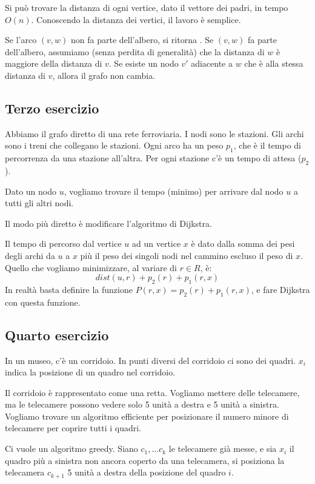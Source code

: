 Si pu\`o trovare la distanza di ogni vertice, dato il vettore dei padri, in tempo $O(n)$. Conoscendo la distanza dei vertici, il lavoro \`e semplice.

Se l'arco $(v,w)$ non fa parte dell'albero, si ritorna . Se $(v,w)$ fa parte dell'albero, assumiamo (senza perdita di generalit\`a) che la distanza di $w$ \`e maggiore della distanza di $v$. Se esiste un nodo $v'$ adiacente a $w$ che \`e alla stessa distanza di $v$, allora il grafo non cambia.

\clearpage

\subsection{Terzo esercizio}

Abbiamo il grafo diretto di una rete ferroviaria. I nodi sono le stazioni. Gli archi sono i treni che collegano le stazioni. Ogni arco ha un peso $p_1$, che \`e il tempo di percorrenza da una stazione all'altra. Per ogni stazione c'\`e un tempo di attesa ($p_2$).

Dato un nodo $u$, vogliamo trovare il tempo (minimo) per arrivare dal nodo $u$ a tutti gli altri nodi.

Il modo pi\`u diretto \`e modificare l'algoritmo di Dijkstra. 

Il tempo di percorso dal vertice $u$ ad un vertice $x$ \`e dato dalla somma dei pesi degli archi da $u$ a $x$ pi\`u il peso dei singoli nodi nel cammino escluso il peso di $x$. Quello che vogliamo minimizzare, al variare di $r \in R$, \`e:
\[
dist(u,r) + p_2(r) + p_1(r,x)
\]
In realt\`a basta definire la funzione $P(r,x) = p_2(r) + p_1(r,x)$, e fare Dijkstra con questa funzione.

\clearpage

\subsection{Quarto esercizio}

In un museo, c'\`e un corridoio. In punti diversi del corridoio ci sono dei quadri. $x_i$ indica la posizione di un quadro nel corridoio.

Il corridoio \`e rappresentato come una retta. Vogliamo mettere delle telecamere, ma le telecamere possono vedere solo 5 unit\`a a destra e 5 unit\`a a sinistra. Vogliamo trovare un algoritmo efficiente per posizionare il numero minore di telecamere per coprire tutti i quadri.

Ci vuole un algoritmo greedy. Siano $c_1, \ldots c_k$ le telecamere gi\`a messe, e sia $x_i$ il quadro pi\`u a sinistra non ancora coperto da una telecamera, si posiziona la telecamera $c_{k+1}$ 5 unit\`a a destra della posizione del quadro $i$.

